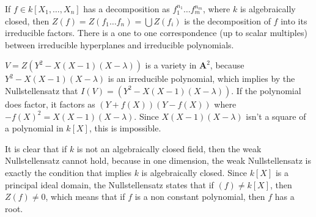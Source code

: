 \begin{corollary}
    If $f \in k[X_1, \dots, X_n]$ has a decomposition as $f_1^{n_1} \dots f_m^{n_m}$, where $k$ is algebraically closed, then $Z(f) = Z(f_1 \dots f_n) = \bigcup Z(f_i)$ is the decomposition of $f$ into its irreducible factors. There is a one to one correspondence (up to scalar multiples) between irreducible hyperplanes and irreducible polynomials.
\end{corollary}

\begin{example}
    $V = Z(Y^2 - X(X-1)(X-\lambda))$ is a variety in $\mathbf{A}^2$, because $Y^2 - X(X-1)(X-\lambda)$ is an irreducible polynomial, which implies by the Nullstellensatz that $I(V) = (Y^2 - X(X-1)(X - \lambda))$. If the polynomial does factor, it factors as $(Y + f(X))(Y - f(X))$ where $-f(X)^2 = X(X-1)(X-\lambda)$. Since $X(X-1)(X-\lambda)$ isn't a square of a polynomial in $k[X]$, this is impossible. 
\end{example}

It is clear that if $k$ is not an algebraically closed field, then the weak Nullstellensatz cannot hold, because in one dimension, the weak Nullstellensatz is exactly the condition that implies $k$ is algebraically closed. Since $k[X]$ is a principal ideal domain, the Nullstellensatz states that if $(f) \neq k[X]$, then $Z(f) \neq 0$, which means that if $f$ is a non constant polynomial, then $f$ has a root.


